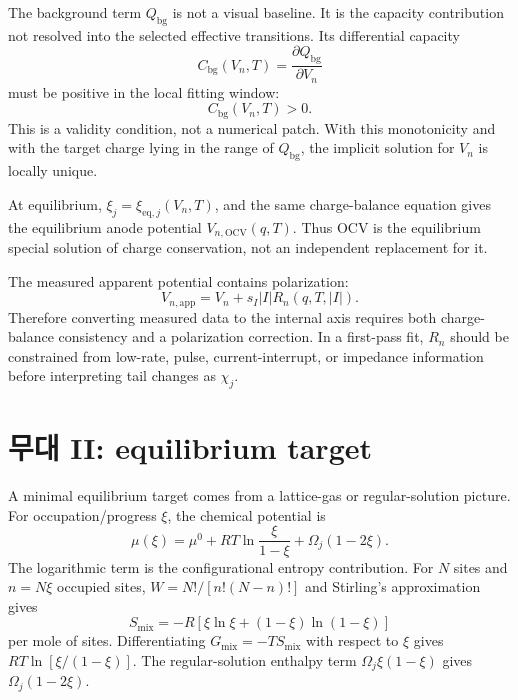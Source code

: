 \documentclass[11pt,a4paper]{article}
\newcommand{\eq}{\mathrm{eq}}
\newcommand{\app}{\mathrm{app}}
\newcommand{\bg}{\mathrm{bg}}
\newcommand{\OCV}{\mathrm{OCV}}
\begin{document}
The background term $Q_{\bg}$ is not a visual baseline. It is the capacity contribution not resolved into the selected effective transitions.
Its differential capacity
\begin{equation}
C_{\bg}(V_n,T)=\frac{\partial Q_{\bg}}{\partial V_n}
\label{eq:Cbg}
\end{equation}
must be positive in the local fitting window:
\begin{equation}
C_{\bg}(V_n,T)>0.
\label{eq:monotone}
\end{equation}
This is a validity condition, not a numerical patch. With this monotonicity and with the target charge lying in the range of $Q_{\bg}$, the
implicit solution for $V_n$ is locally unique.

At equilibrium, $\xi_j=\xi_{\eq,j}(V_n,T)$, and the same charge-balance equation gives the equilibrium anode potential
$V_{n,\OCV}(q,T)$. Thus OCV is the equilibrium special solution of charge conservation, not an independent replacement for it.

The measured apparent potential contains polarization:
\begin{equation}
V_{n,\app}=V_n+s_I|I|R_n(q,T,|I|).
\label{eq:Vapp}
\end{equation}
Therefore converting measured data to the internal axis requires both charge-balance consistency and a polarization correction. In a first-pass
fit, $R_n$ should be constrained from low-rate, pulse, current-interrupt, or impedance information before interpreting tail changes as $\chi_j$.

\section{무대 II: equilibrium target}\label{sec:eq}
A minimal equilibrium target comes from a lattice-gas or regular-solution picture. For occupation/progress $\xi$, the chemical potential is
\begin{equation}
\mu(\xi)=\mu^0+RT\ln\frac{\xi}{1-\xi}+\Omega_j(1-2\xi).
\label{eq:mu_latticegas}
\end{equation}
The logarithmic term is the configurational entropy contribution. For $N$ sites and $n=N\xi$ occupied sites,
$W=N!/[n!(N-n)!]$ and Stirling's approximation gives
\begin{equation}
S_{\mathrm{mix}}=-R[\xi\ln\xi+(1-\xi)\ln(1-\xi)]
\end{equation}
per mole of sites. Differentiating $G_{\mathrm{mix}}=-TS_{\mathrm{mix}}$ with respect to $\xi$ gives
$RT\ln[\xi/(1-\xi)]$. The regular-solution enthalpy term $\Omega_j\xi(1-\xi)$ gives $\Omega_j(1-2\xi)$.
\end{document}
